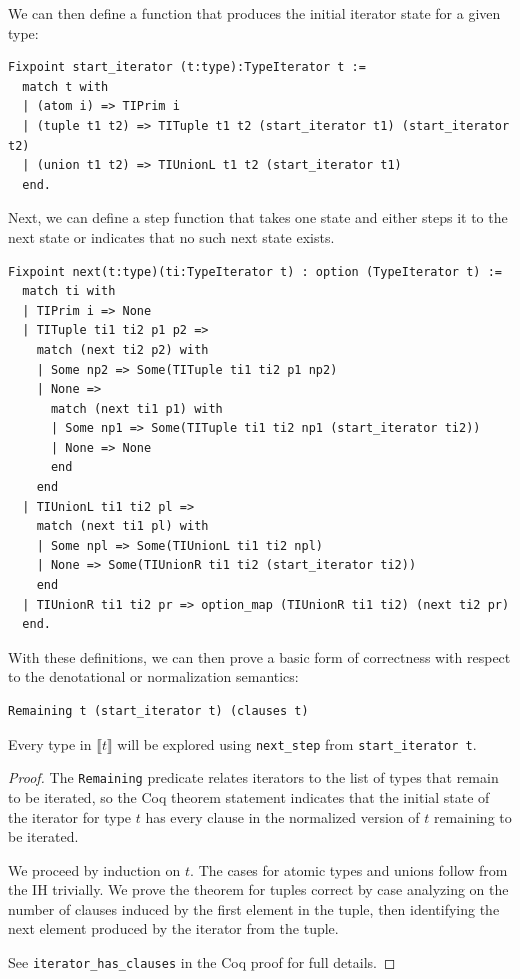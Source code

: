 \documentclass[a4paper,english]{lipics-v2019}
\newcommand{\denotes}[1]{\llbracket #1 \rrbracket}
\begin{document}
\noindent We can then define a function that produces the initial iterator state for a
given type:

\begin{small}
\begin{verbatim}
Fixpoint start_iterator (t:type):TypeIterator t :=
  match t with
  | (atom i) => TIPrim i
  | (tuple t1 t2) => TITuple t1 t2 (start_iterator t1) (start_iterator t2)
  | (union t1 t2) => TIUnionL t1 t2 (start_iterator t1)
  end.
\end{verbatim}
\end{small}

\noindent Next, we can define a step function that takes one state and either steps it
to the next state or indicates that no such next state exists.

\begin{small}\begin{verbatim}
Fixpoint next(t:type)(ti:TypeIterator t) : option (TypeIterator t) :=
  match ti with
  | TIPrim i => None
  | TITuple ti1 ti2 p1 p2 =>
    match (next ti2 p2) with
    | Some np2 => Some(TITuple ti1 ti2 p1 np2)
    | None =>
      match (next ti1 p1) with
      | Some np1 => Some(TITuple ti1 ti2 np1 (start_iterator ti2))
      | None => None
      end
    end
  | TIUnionL ti1 ti2 pl =>
    match (next ti1 pl) with
    | Some npl => Some(TIUnionL ti1 ti2 npl)
    | None => Some(TIUnionR ti1 ti2 (start_iterator ti2))
    end
  | TIUnionR ti1 ti2 pr => option_map (TIUnionR ti1 ti2) (next ti2 pr)
  end.
\end{verbatim}\end{small}

With these definitions, we can then prove a basic form of correctness with
respect to the denotational or normalization semantics:

\begin{theorem}\begin{verbatim}
Remaining t (start_iterator t) (clauses t)
\end{verbatim}
Every type in $\denotes{t}$ will be explored using \verb|next_step| from \verb|start_iterator t|. 
\end{theorem}
\begin{proof}
The \verb|Remaining| predicate relates iterators to the list of types that remain to be iterated, so
the Coq theorem statement indicates that the initial state of the iterator for type $t$ has every clause
in the normalized version of $t$ remaining to be iterated.

We proceed by induction on $t$. The cases for atomic types and unions follow
from the IH trivially. We prove the theorem for tuples correct by case analyzing
on the number of clauses induced by the first element in the tuple, then identifying
the next element produced by the iterator from the tuple.

See \verb|iterator_has_clauses| in the Coq proof for full details.
\end{proof}
\end{document}
